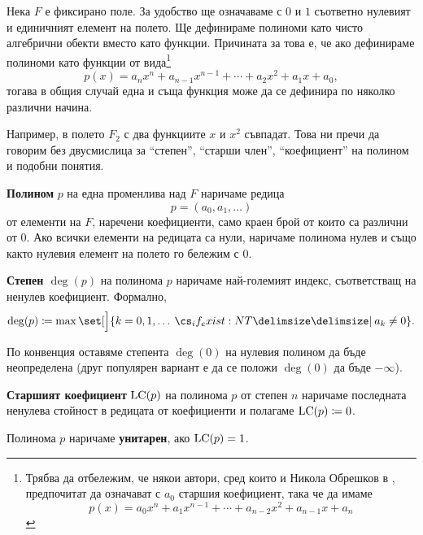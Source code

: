 \documentclass{../../common/topic}
\begin{document}
Нека \( F \) е фиксирано поле. За удобство ще означаваме с \( 0 \) и \( 1 \) съответно нулевият и единичният елемент на полето. Ще дефинираме полиноми като чисто алгебрични обекти вместо като функции. Причината за това е, че ако дефинираме полиноми като функции от вида\footnote{Трябва да отбележим, че някои автори, сред които и Никола Обрешков в \cite[1]{Обрешков1962ВисшаАлгебра}, предпочитат да означават с \( a_0 \) старшия коефициент, така че да имаме
\begin{equation*}
  p(x) = a_0 x^n + a_1 x^{n-1} + \cdots + a_{n-2} x^2 + a_{n-1} x + a_n
\end{equation*}
}
\begin{equation*}
  p(x) = a_n x^n + a_{n-1} x^{n-1} + \cdots + a_2 x^2 + a_1 x + a_0,
\end{equation*}
тогава в общия случай една и съща функция може да се дефинира по няколко различни начина.

Например, в полето \( F_2 \) с два функциите \( x \) и \( x^2 \) съвпадат. Това ни пречи да говорим без двусмислица за \enquote{степен}, \enquote{старши член}, \enquote{коефициент} на полином и подобни понятия.

\begin{definition}
  \textbf{Полином} \( p \) на една променлива над \( F \) наричаме редица
  \begin{equation*}
    p = (a_0, a_1, \ldots)
  \end{equation*}
  от елементи на \( F \), наречени коефициенти, само краен брой от които са различни от \( 0 \). Ако всички елементи на редицата са нули, наричаме полинома нулев и също както нулевия елемент на полето го бележим с \( 0 \).

  \textbf{Степен \( \deg(p) \)} на полинома \( p \) наричаме най-големият индекс, съответстващ на ненулев коефициент. Формално,
  \begin{equation*}
    \deg(p) \coloneqq \max \set[\Big]{ k = 0, 1, \ldots \given* a_k \neq 0 }.
  \end{equation*}

  По конвенция оставяме степента \( \deg(0) \) на нулевия полином да бъде неопределена (друг популярен вариант е да се положи \( \deg(0) \) да бъде \( -\infty \)).

  \textbf{Старшият коефициент} \( \operatorname{LC}(p) \) на полинома \( p \) от степен \( n \) наричаме последната ненулева стойност в редицата от коефициенти и полагаме \( \operatorname{LC}(p) \coloneqq 0 \).

  Полинома \( p \) наричаме \textbf{унитарен}, ако \( \operatorname{LC}(p) = 1 \).
\end{definition}
\end{document}
